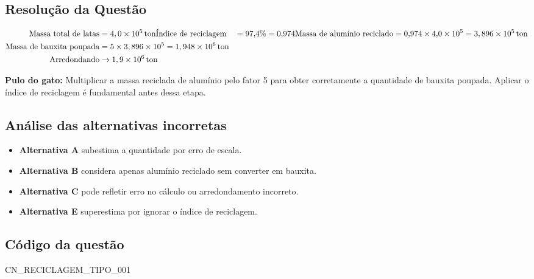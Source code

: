 \documentclass{article}
\begin{document}
\subsection*{Resolução da Questão}
\begin{align*}
\text{Massa total de latas} &= 4,0 \times 10^{5} \, \text{ton}\newline
\text{Índice de reciclagem} &= 97{,}4\% = 0{,}974 \newline
\text{Massa de alumínio reciclado} &= 0{,}974 \times 4{,}0 \times 10^{5} = 3,896 \times 10^{5} \, \text{ton} \\
\text{Massa de bauxita poupada} &= 5 \times 3,896 \times 10^{5} = 1,948 \times 10^{6} \, \text{ton} \\
\text{Arredondando} &\to 1,9 \times 10^{6} \, \text{ton}
\end{align*}

\textbf{Pulo do gato:} Multiplicar a massa reciclada de alumínio pelo fator 5 para obter corretamente a quantidade de bauxita poupada. Aplicar o índice de reciclagem é fundamental antes dessa etapa.

\subsection*{Análise das alternativas incorretas}
\begin{itemize}
  \item \textbf{Alternativa A} subestima a quantidade por erro de escala.
  \item \textbf{Alternativa B} considera apenas alumínio reciclado sem converter em bauxita.
  \item \textbf{Alternativa C} pode refletir erro no cálculo ou arredondamento incorreto.
  \item \textbf{Alternativa E} superestima por ignorar o índice de reciclagem.
\end{itemize}

\subsection*{Código da questão}
CN\_RECICLAGEM\_TIPO\_001
\end{document}
